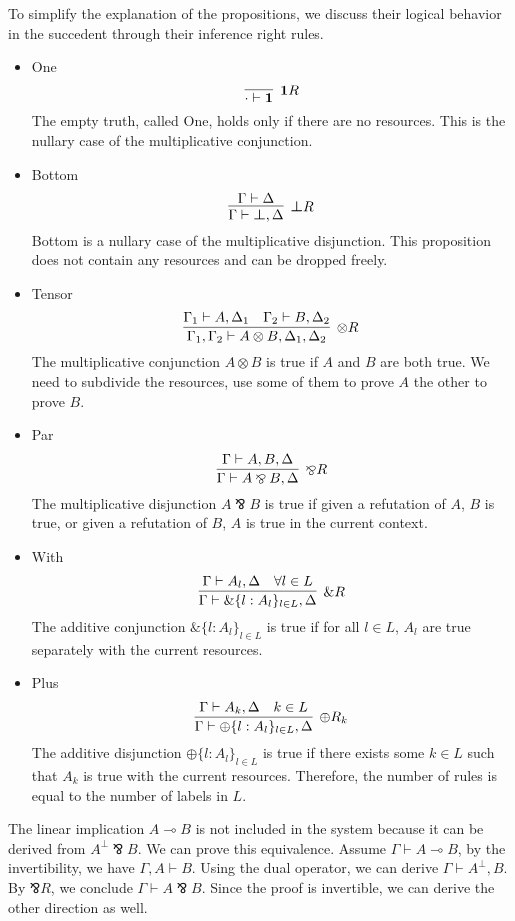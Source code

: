 \documentclass[12pt, openany]{memoir}
\newcommand*{\pare}[0]{\mathbin{\bindnasrepma}}
\begin{document}
To simplify the explanation of the propositions, we discuss their logical behavior in the succedent through their inference right rules.
\begin{itemize}
  \item One
  \[
    \infer[\textbf{1}R]{\cdot \vdash \textbf{1}}{}
  \]
  The empty truth, called One, holds only if there are no resources. 
  This is the nullary case of the multiplicative conjunction.
  \item Bottom
  \[
    \infer[\boldsymbol{\bot} R]{\Gamma \vdash \boldsymbol{\bot}, \Delta}{
      \Gamma \vdash \Delta
    }
  \]
  Bottom is a nullary case of the multiplicative disjunction.
  This proposition does not contain any resources and can be dropped freely.
  \item Tensor
  \[
    \infer[\otimes R]{\Gamma_1, \Gamma_2 \vdash A \otimes B, \Delta_1, \Delta_2}{
      \Gamma_1 \vdash A, \Delta_1
      &
      \Gamma_2 \vdash B, \Delta_2
    }
  \]
  The multiplicative conjunction $A \otimes B$ is true if $A$ and $B$ are both true.
  We need to subdivide the resources, use some of them to prove $A$ the other to prove $B$. 
  \item Par
  \[
    \infer[\pare R]{\Gamma \vdash A \pare B, \Delta}{
      \Gamma \vdash A, B, \Delta
    }
  \]
  The multiplicative disjunction $A \pare B$ is true if given a refutation of $A$, $B$ is true,
  or given a refutation of $B$, $A$ is true in the current context.
  \item With
  \[
    \infer[\& R]{\Gamma \vdash \&\{l : A_l\}_{l \in L}, \Delta}{
      \Gamma \vdash A_l, \Delta
      &
      \forall l \in L
    }
  \]
  The additive conjunction $\&\{l : A_l\}_{l \in L}$ is true if for all $l \in L$, $A_l$ are true separately with the current resources.
  \item Plus
  \[
    \infer[\oplus R_k]{\Gamma \vdash \oplus\{l : A_l\}_{l \in L}, \Delta}{
      \Gamma \vdash A_k, \Delta
      &
      k \in L
    }
  \]
  The additive disjunction $\oplus\{l : A_l\}_{l \in L}$ is true if there exists some $k \in L$ such that $A_k$ is true with the current resources.
  Therefore, the number of rules is equal to the number of labels in $L$.
\end{itemize}
The linear implication $A \multimap B$ is not included in the system because it can be derived from $A^\bot \pare B$. 
We can prove this equivalence. Assume $\Gamma \vdash A \multimap B$, by the invertibility, we have $\Gamma, A \vdash B$. 
Using the dual operator, we can derive $\Gamma \vdash A^\bot, B$. By $\pare R$, we conclude $\Gamma \vdash A \pare B$. 
Since the proof is invertible, we can derive the other direction as well.
\end{document}
